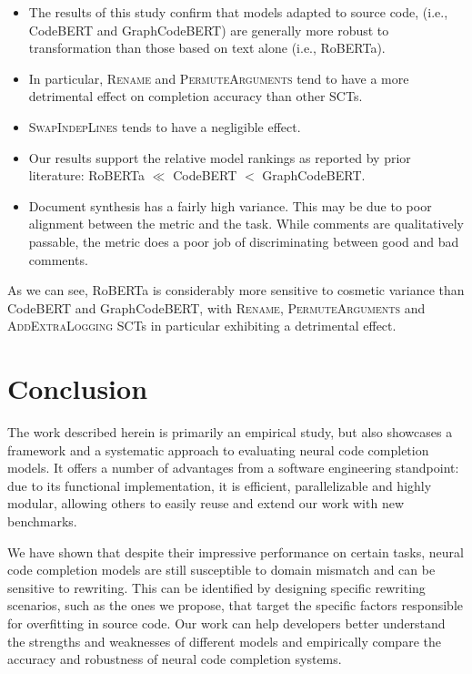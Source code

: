 \documentclass[usenames,dvipsnames]{article} %
\begin{document}
  \begin{itemize}
    \item The results of this study confirm that models adapted to source code, (i.e., CodeBERT and GraphCodeBERT) are generally more robust to transformation than those based on text alone (i.e., RoBERTa).
    \item In particular, \textsc{Rename} and \textsc{PermuteArguments} tend to have a more detrimental effect on completion accuracy than other SCTs.
    \item \textsc{SwapIndepLines} tends to have a negligible effect.
    \item Our results support the relative model rankings as reported by prior literature: RoBERTa $\ll$ CodeBERT $<$ GraphCodeBERT.
    \item Document synthesis has a fairly high variance. This may be due to poor alignment between the metric and the task. While comments are qualitatively passable, the metric does a poor job of discriminating between good and bad comments.
  \end{itemize}

  As we can see, RoBERTa is considerably more sensitive to cosmetic variance than CodeBERT and GraphCodeBERT, with \textsc{Rename}, \textsc{PermuteArguments} and \textsc{AddExtraLogging} SCTs in particular exhibiting a detrimental effect.

  \pagebreak\section{Conclusion}\label{sec:conclusion}

  The work described herein is primarily an empirical study, but also showcases a framework and a systematic approach to evaluating neural code completion models. It offers a number of advantages from a software engineering standpoint: due to its functional implementation, it is efficient, parallelizable and highly modular, allowing others to easily reuse and extend our work with new benchmarks.

  We have shown that despite their impressive performance on certain tasks, neural code completion models are still susceptible to domain mismatch and can be sensitive to rewriting. This can be identified by designing specific rewriting scenarios, such as the ones we propose, that target the specific factors responsible for overfitting in source code. Our work can help developers better understand the strengths and weaknesses of different models and empirically compare the accuracy and robustness of neural code completion systems.
\end{document}
